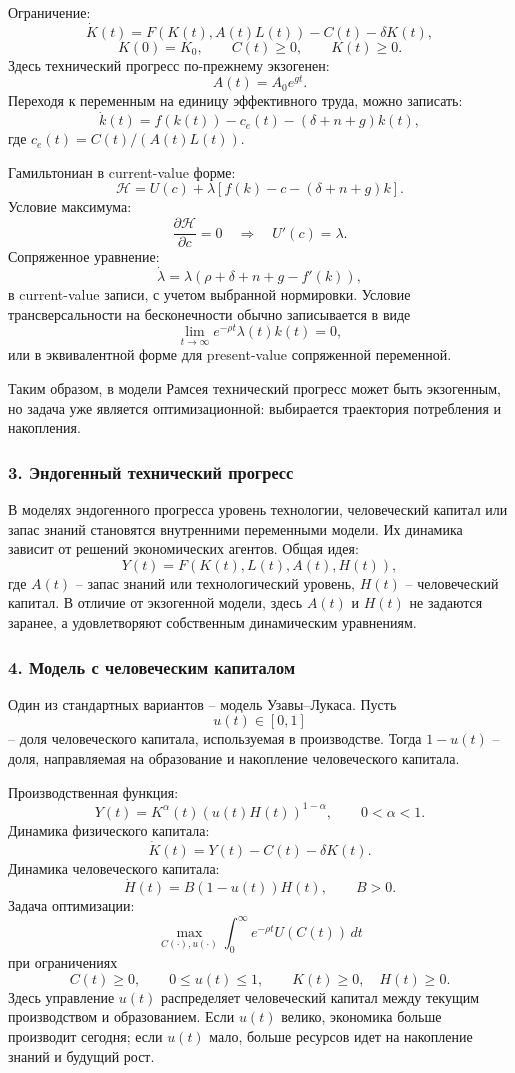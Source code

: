 \documentclass[12pt,a4paper]{article}
\begin{document}
Ограничение:
\[
\dot K(t)=F(K(t),A(t)L(t))-C(t)-\delta K(t),
\]
\[
K(0)=K_0,\qquad C(t)\ge 0,\qquad K(t)\ge 0.
\]
Здесь технический прогресс по-прежнему экзогенен:
\[
A(t)=A_0e^{gt}.
\]
Переходя к переменным на единицу эффективного труда, можно записать:
\[
\dot k(t)=f(k(t))-c_e(t)-(\delta+n+g)k(t),
\]
где $c_e(t)=C(t)/(A(t)L(t))$.

Гамильтониан в current-value форме:
\[
\mathcal H=U(c)+\lambda\left[f(k)-c-(\delta+n+g)k\right].
\]
Условие максимума:
\[
\frac{\partial \mathcal H}{\partial c}=0
\quad\Longrightarrow\quad
U'(c)=\lambda.
\]
Сопряженное уравнение:
\[
\dot\lambda=\lambda\left(\rho+\delta+n+g-f'(k)\right),
\]
в current-value записи, с учетом выбранной нормировки. Условие трансверсальности на бесконечности обычно записывается в виде
\[
\lim_{t\to\infty}e^{-\rho t}\lambda(t)k(t)=0,
\]
или в эквивалентной форме для present-value сопряженной переменной.

Таким образом, в модели Рамсея технический прогресс может быть экзогенным, но задача уже является оптимизационной: выбирается траектория потребления и накопления.

\subsubsection*{3. Эндогенный технический прогресс}
В моделях эндогенного прогресса уровень технологии, человеческий капитал или запас знаний становятся внутренними переменными модели. Их динамика зависит от решений экономических агентов. Общая идея:
\[
Y(t)=F(K(t),L(t),A(t),H(t)),
\]
где $A(t)$ -- запас знаний или технологический уровень, $H(t)$ -- человеческий капитал. В отличие от экзогенной модели, здесь $A(t)$ и $H(t)$ не задаются заранее, а удовлетворяют собственным динамическим уравнениям.

\subsubsection*{4. Модель с человеческим капиталом}
Один из стандартных вариантов -- модель Узавы--Лукаса. Пусть
\[
u(t)\in[0,1]
\]
-- доля человеческого капитала, используемая в производстве. Тогда $1-u(t)$ -- доля, направляемая на образование и накопление человеческого капитала.

Производственная функция:
\[
Y(t)=K^\alpha(t)(u(t)H(t))^{1-\alpha},\qquad 0<\alpha<1.
\]
Динамика физического капитала:
\[
\dot K(t)=Y(t)-C(t)-\delta K(t).
\]
Динамика человеческого капитала:
\[
\dot H(t)=B(1-u(t))H(t),\qquad B>0.
\]
Задача оптимизации:
\[
\max_{C(\cdot),u(\cdot)}\int_0^\infty e^{-\rho t}U(C(t))\,dt
\]
при ограничениях
\[
C(t)\ge 0,\qquad 0\le u(t)\le 1,\qquad K(t)\ge 0,\quad H(t)\ge 0.
\]
Здесь управление $u(t)$ распределяет человеческий капитал между текущим производством и образованием. Если $u(t)$ велико, экономика больше производит сегодня; если $u(t)$ мало, больше ресурсов идет на накопление знаний и будущий рост.
\end{document}
